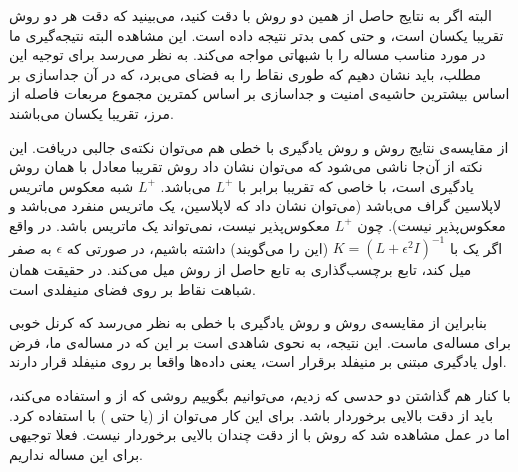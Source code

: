 \documentclass[11pt]{article}
\begin{document}
البته اگر به نتایج حاصل از همین دو روش با  \RBF{} دقت کنید، می‌بینید که دقت هر دو روش تقریبا یکسان است، و حتی \SVM{} کمی بدتر نتیجه داده است. این مشاهده البته نتیجه‌گیری ما در مورد \lossfunction{} مناسب مساله را با شبهاتی مواجه می‌کند. به نظر می‌رسد برای توجیه این مطلب، باید نشان دهیم که  \RBF{} طوری نقاط را به فضای \embedding{} می‌برد، که در آن‌ جداسازی بر اساس بیشترین حاشیه‌ی امنیت و جداسازی بر اساس کمترین مجموع مربعات فاصله از مرز، تقریبا یکسان می‌باشند.

از مقایسه‌ی نتایج روش \LGC{}  و روش یادگیری
 \gaussianprocess{}
 با  
خطی هم می‌توان نکته‌ی جالبی دریافت. این نکته از آن‌جا ناشی می‌شود که می‌توان نشان داد روش \LGC{} تقریبا معادل با همان روش یادگیری \gaussianprocess{} است، با 
 خاصی که تقریبا برابر با $L^+$  می‌باشد.  $L^+$ شبه معکوس ماتریس لاپلاسین گراف می‌باشد (می‌توان نشان داد که لاپلاسین، یک ماتریس منفرد می‌باشد و معکوس‌پذیر نیست). چون $L^+$ معکوس‌پذیر نیست، نمی‌تواند یک ماتریس 
  باشد. در واقع اگر یک \gaussianprocess{} با 
  $K = (L + \epsilon^2I)^{-1}$
   (این  را  \difL{} می‌گویند) داشته باشیم، در صورتی که $\epsilon$ به صفر میل کند، تابع برچسب‌گذاری به تابع حاصل از روش \LGC{} میل می‌کند.  \difL{} در حقیقت همان شباهت نقاط بر روی فضای منیفلدی است.%

بنابراین از مقایسه‌ی روش \LGC{} و  روش یادگیری \gaussianprocess{} با  خطی به نظر می‌رسد که  \difL{} کرنل خوبی برای مساله‌ی ماست. این نتیجه، به نحوی شاهدی است بر این که در مساله‌ی ما، فرض اول یادگیری مبتنی بر منیفلد برقرار است، یعنی داده‌ها واقعا بر روی منیفلد قرار دارند.

با کنار هم گذاشتن دو حدسی که زدیم، می‌توانیم بگوییم روشی که از \lossfunction{} \hinge{}  و  \difL{} استفاده می‌کند، باید از دقت بالایی برخوردار باشد. برای این کار می‌توان از \SVM{} (یا حتی \LapSVM{}) با  \difL{} استفاده کرد. اما در عمل مشاهده شد که روش \SVM{} با  \difL{} از دقت چندان بالایی برخوردار نیست. فعلا توجیهی برای این مساله نداریم.
\end{document}
